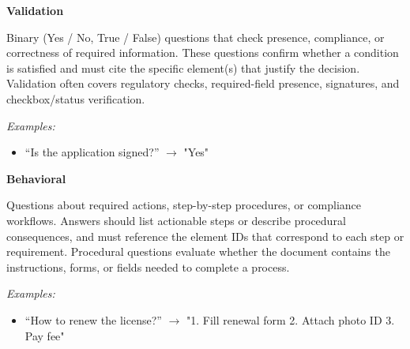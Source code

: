 \begin{tcolorbox}[prompt_procedural, title=Procedural QA Taxonomy]
\textbf{Validation}

Binary (Yes / No, True / False) questions that check presence, compliance, or correctness of required information.
These questions confirm whether a condition is satisfied and must cite the specific element(s) that justify the decision.
Validation often covers regulatory checks, required-field presence, signatures, and checkbox/status verification.

\medskip
\textit{Examples:}
\begin{itemize}
  \item ``Is the application signed?'' $\rightarrow$  "Yes"
\end{itemize}

\textbf{Behavioral}

Questions about required actions, step-by-step procedures, or compliance workflows. Answers should list actionable steps or describe procedural consequences, and must reference the element IDs that correspond to each step or requirement. Procedural questions evaluate whether the document contains the instructions, forms, or fields needed to complete a process.

\medskip
\textit{Examples:}
\begin{itemize}
  \item ``How to renew the license?'' $\rightarrow$ "1. Fill renewal form 2. Attach photo ID 3. Pay fee"
  
 
\end{itemize}
\end{tcolorbox}


